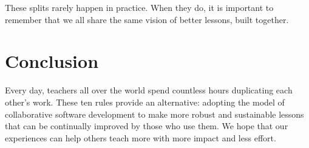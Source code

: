 \documentclass[10pt,letterpaper]{article}
\begin{document}
These splits rarely happen in practice.
When they do,
it is important to remember that we all share the same vision of better lessons, built together.

\section*{Conclusion}

Every day,
teachers all over the world spend countless hours duplicating each other's work.
These ten rules provide an alternative:
adopting the model of collaborative software development
to make more robust and sustainable lessons
that can be continually improved by those who use them.
We hope that our experiences can help others teach more
with more impact and less effort.

\nolinenumbers

%
%

\newpage
\end{document}
